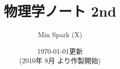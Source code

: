 ﻿%

    \title{
        \Huge{物理学ノート 2nd}
    }

    \author{
            Min Spark (X)
    }

    \date{
        \today \quad 更新\\
        {\small (2010年 8月 より作製開始)}
    }
    \par

